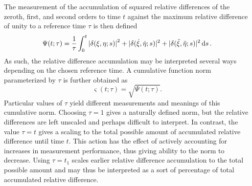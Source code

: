 \documentclass[11pt]{thesis}
\numberwithin{equation}{section}
\begin{document}
The measurement of the accumulation of squared relative differences of the zeroth, first, and second orders to time $t$ against the maximum relative difference of unity to a reference time $\tau$ is then defined
\begin{equation}
\Psi(t; \tau) = \frac{1}{\tau}\int_0^t \abs{\delta(\xi, \eta; s)}^2 + |\delta(\dot{\xi}, \dot{\eta}; s)|^2 + |\delta(\ddot{\xi}, \ddot{\eta}; s)|^2 \dd{s}.
\end{equation}
As such, the relative difference accumulation may be interpreted several ways depending on the chosen reference time. A cumulative function norm parameterized by $\tau$ is further obtained as
\begin{equation}
\varsigma(t; \tau) = \sqrt{\Psi(t; \tau)}.
\end{equation}
Particular values of $\tau$ yield different measurements and meanings of this cumulative norm. Choosing $\tau = 1$ gives a naturally defined norm, but the relative differences are left unscaled and perhaps difficult to interpret. In contrast, the value $\tau = t$ gives a scaling to the total possible amount of accumulated relative difference until time $t$. This action has the effect of actively accounting for increases in measurement performance, thus giving ability to the norm to decrease. Using $\tau = t_1$ scales earlier relative difference accumulation to the total possible amount and may thus be interpreted as a sort of percentage of total accumulated relative difference.
\end{document}

